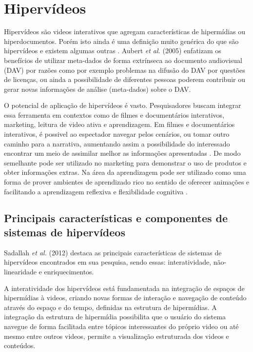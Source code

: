 \section{Hipervídeos}

Hipervídeos são videos interativos que agregam características de hipermídias ou hiperdocumentos. Porém isto ainda é uma definição muito genérica do que são hipervídeos e existem algumas outras \cite{chambel2004}. Aubert \textit{et al.} (2005) enfatizam os benefícios de utilizar meta-dados de forma extrínseca ao documento audiovisual (DAV) por razões como por exemplo problemas na difusão do DAV por questões de licenças, ou ainda a possibilidade de diferentes pessoas poderem contribuir ou gerar novas informações de análise (meta-dados) sobre o DAV.

O potencial de aplicação de hipervídeos é vasto. Pesquisadores buscam integrar essa ferramenta em contextos como de filmes e documentários interativos, marketing, leitura de video ativa e aprendizagem. Em filmes e documentários interativos, é possivel ao espectador navegar pelos cenários, ou tomar outro caminho para a narrativa, aumentando assim a possibilidade do interessado encontrar um meio de assimilar melhor as informações apresentadas \cite{mozilla2012, sawhney1996, lippman1980, shipman2003}. De modo semelhante pode ser utilizado no marketing para demonstrar o uso de produtos e obter informações extras. Na área da aprendizagem pode ser utilizado como uma forma de prover ambientes de aprendizado rico no sentido de oferecer animações e facilitando a aprendizagem reflexiva e flexibilidade cognitiva \cite{zhan2004, shipman2003}.

\subsection{Principais características e componentes de sistemas de hipervídeos}

Sadallah \textit{et al.} (2012) destaca as principais características de sistemas de hipervídeos encontrados em sua pesquisa, sendo essas: interatividade, não-linearidade e enriquecimentos.

A interatividade dos hipervídeos está fundamentada na integração de espaços de hipermídias à videos, criando novas formas de interação e navegação de conteúdo através do espaço e do tempo, definidas na estrutura de hipermídias. A integração da estrutura de hipermídia possibilita que o usuário do sistema navegue de forma facilitada entre tópicos interessantes do próprio video ou até mesmo entre outros videos, permite a visualização estruturada dos videos e conteúdos.

